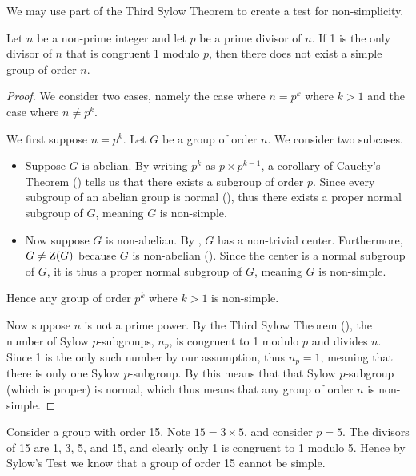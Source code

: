 We may use part of the Third Sylow Theorem to create a test for non-simplicity.
\begin{theorem}
    Let $n$ be a non-prime integer and let $p$ be a prime divisor of $n$. If 1 is the only divisor of $n$ that is congruent 1 modulo $p$, then there does not exist a simple group of order $n$.
\end{theorem}
\begin{proof}
    We consider two cases, namely the case where $n=p^k$ where $k>1$ and the case where $n \neq p^k$.
    
    We first suppose $n = p^k$. Let $G$ be a group of order $n$. We consider two subcases.
    \begin{itemize}
        \item Suppose $G$ is abelian. By writing $p^k$ as $p \times p^{k-1}$, a corollary of Cauchy's Theorem () tells us that there exists a subgroup of order $p$. Since every subgroup of an abelian group is normal (), thus there exists a proper normal subgroup of $G$, meaning $G$ is non-simple.
        \item Now suppose $G$ is non-abelian. By , $G$ has a non-trivial center. Furthermore, $G \neq \mathrm{Z}(G)$ because $G$ is non-abelian (). Since the center is a normal subgroup of $G$, it is thus a proper normal subgroup of $G$, meaning $G$ is non-simple.
    \end{itemize}
    Hence any group of order $p^k$ where $k > 1$ is non-simple.

    Now suppose $n$ is not a prime power. By the Third Sylow Theorem (), the number of Sylow $p$-subgroups, $n_p$, is congruent to 1 modulo $p$ and divides $n$. Since 1 is the only such number by our assumption, thus $n_p = 1$, meaning that there is only one Sylow $p$-subgroup. By  this means that that Sylow $p$-subgroup (which is proper) is normal, which thus means that any group of order $n$ is non-simple.
\end{proof}
\begin{example}
    Consider a group with order 15. Note $15 = 3 \times 5$, and consider $p = 5$. The divisors of 15 are 1, 3, 5, and 15, and clearly only 1 is congruent to 1 modulo 5. Hence by Sylow's Test we know that a group of order 15 cannot be simple.
\end{example}


